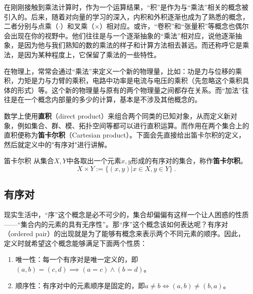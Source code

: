

在刚刚接触到乘法计算时，作为一个运算结果，“积”是作为与“乘法”相关的概念被引入的。后来，随着对向量的学习的深入，内积和外积逐渐也成为了熟悉的概念，二者分别与点乘（$\cdot$）和叉乘（$\times$）相对应。或许，“卷积”和“张量积”等概念也偶尔会出现在你的视野中。他们往往是与一个逐渐抽象的“乘法”相对应，说他逐渐抽象，是因为他与我们熟知的数的乘法的样子和计算方法相去甚远。而还称呼它是乘法，是因为某种程度上，它保留了乘法的一些特性。

在物理上，常常会通过“乘法”来定义一个新的物理量，比如：功是力与位移的乘积，力矩是力与力臂的乘积，电路中功率是电流与电压的乘积（先忽略这个乘积具体的形式）等。这个新的物理量与原有的两个物理量之间都存在关系。而“加法”往往是在一个概念内部量的多少的计算，基本是不涉及其他概念的。

数学上使用\textbf{直积}（direct product）来组合两个同类的已知对象，从而定义新对象，例如集合、群、模、拓扑空间等都可以进行直积运算。而作用在两个集合上的直积便称为\textbf{笛卡尔积}（Cartesian product）。下面会先直接给出笛卡尔积的定义，然后就定义中的"有序对"进行讲解。

\begin{definition}{笛卡尔积}\label{def_CartPr_1}
从集合$X,Y$中各取出一个元素$x,y$形成的有序对的集合，称作\textbf{笛卡尔积}。
\begin{equation}
X\times Y:=\{(x,y)|x\in X,y\in Y\}~.
\end{equation}

\end{definition}

\subsection{有序对}

现实生活中，“序”这个概念是必不可少的，集合却偏偏有这样一个让人困惑的性质——“集合内的元素的具有无序性”。那“序”这个概念该如何表达呢？有序对（ordered pair）的出现就是为了能够有概念来表示两个不同元素的顺序。因此，定义时就希望这个概念能够满足下面两个性质：

\begin{enumerate}
\item 唯一性：每一个有序对是唯一定义的，即$(a, b) = (c, d)\implies (a = c) \land (b = d)$。
\item 顺序性：有序对中的元素顺序是固定的，即$a\neq b\iff(a, b)\neq (b, a)$。
\end{enumerate}


